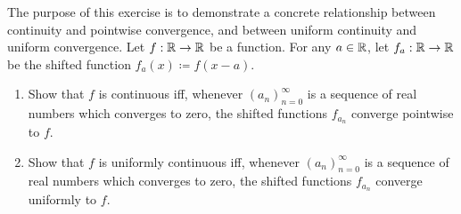 \exercisesection

\begin{ex}\label{ii:ex:3.2.1}
  The purpose of this exercise is to demonstrate a concrete relationship between continuity and pointwise convergence, and between uniform continuity and uniform convergence.
  Let \(f : \mathbb{R} \to \mathbb{R}\) be a function.
  For any \(a \in \mathbb{R}\), let \(f_a : \mathbb{R} \to \mathbb{R}\) be the shifted function \(f_a(x) \coloneqq f(x - a)\).
  \begin{enumerate}
    \item Show that \(f\) is continuous iff, whenever \((a_n)_{n = 0}^\infty\) is a sequence of real numbers which converges to zero, the shifted functions \(f_{a_n}\) converge pointwise to \(f\).
    \item Show that \(f\) is uniformly continuous iff, whenever \((a_n)_{n = 0}^\infty\) is a sequence of real numbers which converges to zero, the shifted functions \(f_{a_n}\) converge uniformly to \(f\).
  \end{enumerate}
\end{ex}

